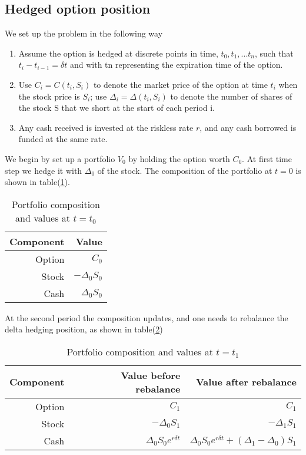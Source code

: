 \documentclass[10pt]{article}
\theoremstyle{plain}
\numberwithin{equation}{section}
\numberwithin{table}{section}
\newcommand{\de}{\delta}
\begin{document}
\subsection{Hedged option position}

We set up the problem in the following way
\begin{enumerate}
    \item Assume the option
    is hedged at discrete points in time, $t_0, t_1,...t_n$, such that $t_i-t_{i-1}=\de t$ and
    with tn representing the expiration time of the option.
    \item Use $C_i = C(t_i, S_i)$ to denote the market price of the option at time $t_i$ when the
    stock price is $S_i$; use $\Delta_i=\Delta(t_i, S_i)$ to denote the number of shares of
    the stock S that we short at the start of each period i.
    \item Any cash received is
    invested at the riskless rate $r$, and any cash borrowed is funded at the same
    rate.
\end{enumerate}

We begin by set up a portfolio $V_0$ by holding the option worth $C_0$. At first time step we hedge it with $\Delta_0$ of the stock. The composition of the portfolio at $t=0$ is shown in table(\ref{table_hedging_ptf_0}). 

\begin{table}[H]
    \centering
    \begin{tabular}{|rr|}
    \hline Component & Value\\
    \hline Option&$C_{0}$\\
        Stock& $-\Delta_0 S_{0}$\\
        Cash&$\Delta_0 S_{0}$\\
    \hline
    \end{tabular}\caption{Portfolio composition and values at $t=t_0$}
    \label{table_hedging_ptf_0}
\end{table}

At the second period the composition updates, and one needs to rebalance the delta hedging position, as shown in table(\ref{table_hedging_ptf_1}) 
\begin{table}[H]
    \centering
    \begin{tabular}{|rrr|}
    \hline Component & Value before rebalance & Value after rebalance \\
    \hline Option  &   $C_{1}$                & $C_{1}$  \\ 
        Stock      & $-\Delta_0 S_{1}$        & $-\Delta_1 S_{1}$\\
        Cash      & $\Delta_0 S_0e^{r\de t}$ & $\Delta_0 S_0e^{r\de t}+(\Delta_1-\Delta_0)S_1$ \\
    \hline
    \end{tabular}\caption{Portfolio composition and values at $t=t_1$}
    \label{table_hedging_ptf_1}
\end{table}
\end{document}
